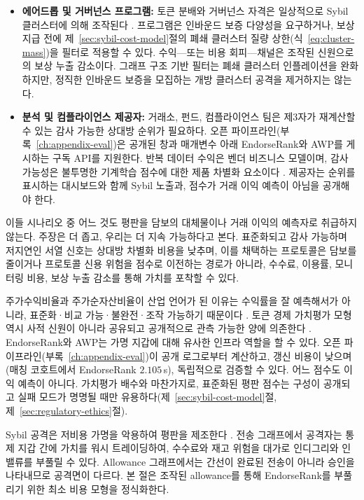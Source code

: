 \begin{itemize}
\item \textbf{에어드롭 및 거버넌스 프로그램:} 토큰 분배와 거버넌스 자격은 일상적으로 Sybil 클러스터에 의해 조작된다 . 프로그램은 인바운드 보증 다양성을 요구하거나, 보상 지급 전에 제~\ref{sec:sybil-cost-model}절의 폐쇄 클러스터 질량 상한(식~\ref{eq:cluster-mass})을 필터로 적용할 수 있다. 수익---또는 비용 회피---채널은 조작된 신원으로의 보상 누출 감소이다. 그래프 구조 기반 필터는 폐쇄 클러스터 인플레이션을 완화하지만, 정직한 인바운드 보증을 모집하는 개방 클러스터 공격을 제거하지는 않는다.

\item \textbf{분석 및 컴플라이언스 제공자:} 거래소, 펀드, 컴플라이언스 팀은 제3자가 재계산할 수 있는 감사 가능한 상대방 순위가 필요하다. 오픈 파이프라인(부록~\ref{ch:appendix-eval})은 공개된 창과 매개변수 아래 EndorseRank와 AWP를 게시하는 구독 API를 지원한다. 반복 데이터 수익은 벤더 비즈니스 모델이며, 감사 가능성은 불투명한 기계학습 점수에 대한 제품 차별화 요소이다 . 제공자는 순위를 표시하는 대시보드와 함께 Sybil 노출과, 점수가 거래 이익 예측이 아님을 공개해야 한다.
\end{itemize}

이들 시나리오 중 어느 것도 평판을 담보의 대체물이나 거래 이익의 예측자로 취급하지 않는다. 주장은 더 좁고, 우리는 더 지속 가능하다고 본다. 표준화되고 감사 가능하며 저지연인 서열 신호는 상대방 차별화 비용을 낮추며, 이를 채택하는 프로토콜은 담보를 줄이거나 프로토콜 신용 위험을 점수로 이전하는 경로가 아니라, 수수료, 이용률, 모니터링 비용, 보상 누출 감소를 통해 가치를 포착할 수 있다.


주가수익비율과 주가순자산비율이 산업 언어가 된 이유는 수익률을 잘 예측해서가 아니라, 표준화·비교 가능·불완전·조작 가능하기 때문이다 . 토큰 경제 가치평가 모형 역시 사적 신원이 아니라 공유되고 공개적으로 관측 가능한 양에 의존한다 . EndorseRank와 AWP는 가명 지갑에 대해 유사한 인프라 역할을 할 수 있다. 오픈 파이프라인(부록~\ref{ch:appendix-eval})이 공개 로그로부터 계산하고, 갱신 비용이 낮으며(매칭 코호트에서 EndorseRank $2.105$\,s), 독립적으로 검증할 수 있다. 어느 점수도 이익 예측이 아니다. 가치평가 배수와 마찬가지로, 표준화된 평판 점수는 구성이 공개되고 실패 모드가 명명될 때만 유용하다(제~\ref{sec:sybil-cost-model}절, 제~\ref{sec:regulatory-ethics}절).


Sybil 공격은 저비용 가명을 악용하여 평판을 제조한다 . 전송 그래프에서 공격자는 통제 지갑 간에 가치를 워시 트레이딩하여, 수수료와 재고 위험을 대가로 인디그리와 인밸류를 부풀릴 수 있다. Allowance 그래프에서는 간선이 완료된 전송이 아니라 승인을 나타내므로 공격면이 다르다. 본 절은 조작된 allowance를 통해 EndorseRank를 부풀리기 위한 최소 비용 모형을 정식화한다.

